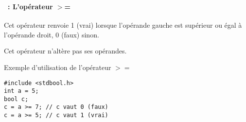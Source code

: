 \begin{frame}[containsverbatim]
  \frametitle{\secname}
  \framesubtitle{\subsecname~: L'opérateur $>$=} 

  Cet opérateur renvoie 1 (vrai) lorsque l'opérande gauche est supérieur ou égal à l'opérande droit, 0 (faux) sinon. 
  \par
  Cet opérateur n'altère pas ses opérandes.
  \vspace{0.3cm}
  \begin{exampleblock}{Exemple d'utilisation de l'opérateur $>=$}
    \begin{verbatim}
#include <stdbool.h>
int a = 5;
bool c;
c = a >= 7; // c vaut 0 (faux)
c = a >= 5; // c vaut 1 (vrai)\end{verbatim}
  \end{exampleblock}
\end{frame}

